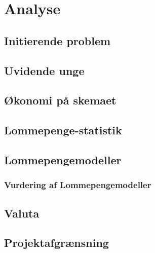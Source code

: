 





\tableofcontents

\chapter{Analyse}

\section{Initierende problem}


\section{Uvidende unge}
\label{UvidendeUnge}


\section{Økonomi på skemaet}
\label{Okonomi}


\section{Lommepenge-statistik}
\label{LommeStat}


\section{Lommepengemodeller}
\label{LommeModeller}

\subsection{Vurdering af Lommepengemodeller}
\label{ModelVurdering}


\section{Valuta}
\label{Valuta}


\section{Projektafgrænsning}


